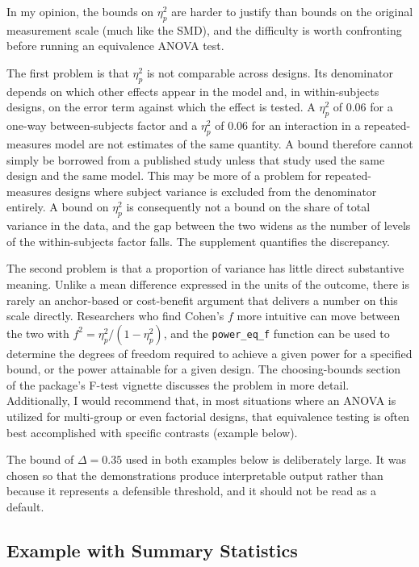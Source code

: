 \documentclass[]{interact}
\theoremstyle{plain}%
\theoremstyle{definition}
\theoremstyle{remark}
\begin{document}
In my opinion, the bounds on \(\eta^2_p\) are harder to justify than
bounds on the original measurement scale (much like the SMD), and the
difficulty is worth confronting before running an equivalence ANOVA
test.

The first problem is that \(\eta^2_p\) is not comparable across designs.
Its denominator depends on which other effects appear in the model and,
in within-subjects designs, on the error term against which the effect
is tested. A \(\eta^2_p\) of 0.06 for a one-way between-subjects factor
and a \(\eta^2_p\) of 0.06 for an interaction in a repeated-measures
model are not estimates of the same quantity. A bound therefore cannot
simply be borrowed from a published study unless that study used the
same design and the same model. This may be more of a problem for
repeated-measures designs where subject variance is excluded from the
denominator entirely. A bound on \(\eta^2_p\) is consequently not a
bound on the share of total variance in the data, and the gap between
the two widens as the number of levels of the within-subjects factor
falls. The supplement quantifies the discrepancy.

The second problem is that a proportion of variance has little direct
substantive meaning. Unlike a mean difference expressed in the units of
the outcome, there is rarely an anchor-based or cost-benefit argument
that delivers a number on this scale directly. Researchers who find
Cohen's \(f\) more intuitive can move between the two with
\(f^2 = \eta^2_p / (1 - \eta^2_p)\), and the \texttt{power\_eq\_f}
function can be used to determine the degrees of freedom required to
achieve a given power for a specified bound, or the power attainable for
a given design. The choosing-bounds section of the package's F-test
vignette discusses the problem in more detail. Additionally, I would
recommend that, in most situations where an ANOVA is utilized for
multi-group or even factorial designs, that equivalence testing is often
best accomplished with specific contrasts (example below).

The bound of \(\Delta = 0.35\) used in both examples below is
deliberately large. It was chosen so that the demonstrations produce
interpretable output rather than because it represents a defensible
threshold, and it should not be read as a default.

\subsection{Example with Summary
Statistics}\label{example-with-summary-statistics}
\end{document}
